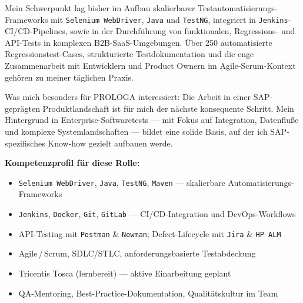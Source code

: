\documentclass[10.5pt, a4paper]{article}
\begin{document}
Mein Schwerpunkt lag bisher im Aufbau skalierbarer Testautomatisierungs-Frameworks mit \texttt{Selenium WebDriver}, \texttt{Java} und \texttt{TestNG}, integriert in \texttt{Jenkins}-CI/CD-Pipelines, sowie in der Durchf\"{u}hrung von funktionalen, Regressions- und API-Tests in komplexen B2B-SaaS-Umgebungen. \"{U}ber 250 automatisierte Regressionstest-Cases, strukturierte Testdokumentation und die enge Zusammenarbeit mit Entwicklern und Product Ownern im Agile-Scrum-Kontext geh\"{o}ren zu meiner t\"{a}glichen Praxis.

\vspace{4pt}
\begin{mdframed}[
  backgroundcolor=lightgreen,
  linecolor=bordergreen,
  linewidth=1.5pt,
  leftline=true, rightline=false, topline=false, bottomline=false,
  innerleftmargin=12pt, innerrightmargin=12pt,
  innertopmargin=8pt, innerbottommargin=8pt
]
{\small\color{prologreen!60!black}
Was mich besonders f\"{u}r PROLOGA interessiert: Die Arbeit in einer SAP-gepr\"{a}gten Produktlandschaft ist f\"{u}r mich der n\"{a}chste konsequente Schritt. Mein Hintergrund in Enterprise-Softwaretests --- mit Fokus auf Integration, Datenflu\ss{}e und komplexe Systemlandschaften --- bildet eine solide Basis, auf der ich SAP-spezifisches Know-how gezielt aufbauen werde.
}
\end{mdframed}
\vspace{6pt}

\textbf{Kompetenzprofil f\"{u}r diese Rolle:}

\begin{itemize}[leftmargin=1.4em, itemsep=2pt, topsep=4pt, parsep=0pt]
  \item \texttt{Selenium WebDriver}, \texttt{Java}, \texttt{TestNG}, \texttt{Maven} --- skalierbare Automatisierungs-Frameworks
  \item \texttt{Jenkins}, \texttt{Docker}, \texttt{Git}, \texttt{GitLab} --- CI/CD-Integration und DevOps-Workflows
  \item API-Testing mit \texttt{Postman} \& \texttt{Newman}; Defect-Lifecycle mit \texttt{Jira} \& \texttt{HP ALM}
  \item Agile\,/\,Scrum, SDLC/STLC, anforderungsbasierte Testabdeckung
  \item Tricentis Tosca (lernbereit) --- aktive Einarbeitung geplant
  \item QA-Mentoring, Best-Practice-Dokumentation, Qualit\"{a}tskultur im Team
\end{itemize}

\vspace{6pt}
\end{document}
